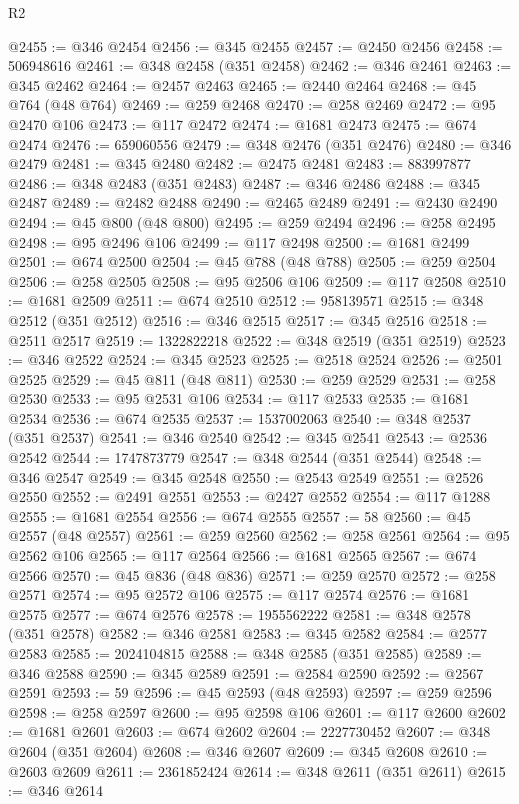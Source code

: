 \begin{lexlean}{R2}
\begin{coremodule}
@2455 := @346 @2454
@2456 := @345 @2455
@2457 := @2450 @2456
@2458 := 506948616
@2461 := @348 @2458 (@351 @2458)
@2462 := @346 @2461
@2463 := @345 @2462
@2464 := @2457 @2463
@2465 := @2440 @2464
@2468 := @45 @764 (@48 @764)
@2469 := @259 @2468
@2470 := @258 @2469
@2472 := @95 @2470 @106
@2473 := @117 @2472
@2474 := @1681 @2473
@2475 := @674 @2474
@2476 := 659060556
@2479 := @348 @2476 (@351 @2476)
@2480 := @346 @2479
@2481 := @345 @2480
@2482 := @2475 @2481
@2483 := 883997877
@2486 := @348 @2483 (@351 @2483)
@2487 := @346 @2486
@2488 := @345 @2487
@2489 := @2482 @2488
@2490 := @2465 @2489
@2491 := @2430 @2490
@2494 := @45 @800 (@48 @800)
@2495 := @259 @2494
@2496 := @258 @2495
@2498 := @95 @2496 @106
@2499 := @117 @2498
@2500 := @1681 @2499
@2501 := @674 @2500
@2504 := @45 @788 (@48 @788)
@2505 := @259 @2504
@2506 := @258 @2505
@2508 := @95 @2506 @106
@2509 := @117 @2508
@2510 := @1681 @2509
@2511 := @674 @2510
@2512 := 958139571
@2515 := @348 @2512 (@351 @2512)
@2516 := @346 @2515
@2517 := @345 @2516
@2518 := @2511 @2517
@2519 := 1322822218
@2522 := @348 @2519 (@351 @2519)
@2523 := @346 @2522
@2524 := @345 @2523
@2525 := @2518 @2524
@2526 := @2501 @2525
@2529 := @45 @811 (@48 @811)
@2530 := @259 @2529
@2531 := @258 @2530
@2533 := @95 @2531 @106
@2534 := @117 @2533
@2535 := @1681 @2534
@2536 := @674 @2535
@2537 := 1537002063
@2540 := @348 @2537 (@351 @2537)
@2541 := @346 @2540
@2542 := @345 @2541
@2543 := @2536 @2542
@2544 := 1747873779
@2547 := @348 @2544 (@351 @2544)
@2548 := @346 @2547
@2549 := @345 @2548
@2550 := @2543 @2549
@2551 := @2526 @2550
@2552 := @2491 @2551
@2553 := @2427 @2552
@2554 := @117 @1288
@2555 := @1681 @2554
@2556 := @674 @2555
@2557 := 58
@2560 := @45 @2557 (@48 @2557)
@2561 := @259 @2560
@2562 := @258 @2561
@2564 := @95 @2562 @106
@2565 := @117 @2564
@2566 := @1681 @2565
@2567 := @674 @2566
@2570 := @45 @836 (@48 @836)
@2571 := @259 @2570
@2572 := @258 @2571
@2574 := @95 @2572 @106
@2575 := @117 @2574
@2576 := @1681 @2575
@2577 := @674 @2576
@2578 := 1955562222
@2581 := @348 @2578 (@351 @2578)
@2582 := @346 @2581
@2583 := @345 @2582
@2584 := @2577 @2583
@2585 := 2024104815
@2588 := @348 @2585 (@351 @2585)
@2589 := @346 @2588
@2590 := @345 @2589
@2591 := @2584 @2590
@2592 := @2567 @2591
@2593 := 59
@2596 := @45 @2593 (@48 @2593)
@2597 := @259 @2596
@2598 := @258 @2597
@2600 := @95 @2598 @106
@2601 := @117 @2600
@2602 := @1681 @2601
@2603 := @674 @2602
@2604 := 2227730452
@2607 := @348 @2604 (@351 @2604)
@2608 := @346 @2607
@2609 := @345 @2608
@2610 := @2603 @2609
@2611 := 2361852424
@2614 := @348 @2611 (@351 @2611)
@2615 := @346 @2614

\end{coremodule}
\end{lexlean}
